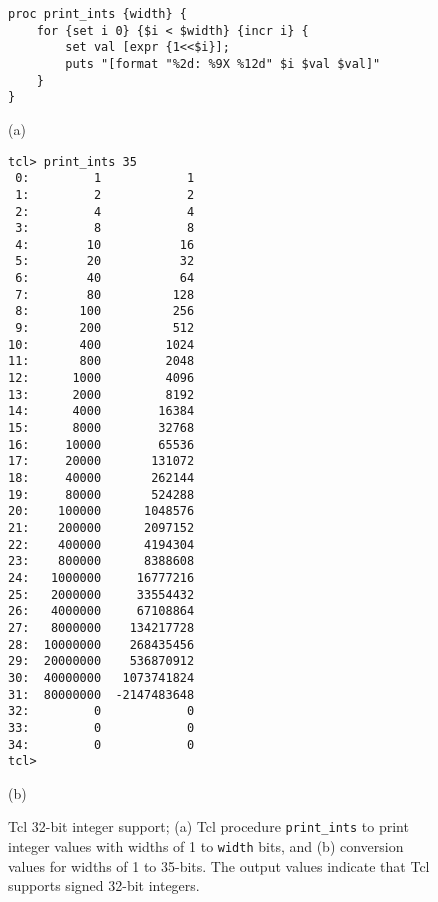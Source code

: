\documentclass[10pt,twoside]{article}
\begin{document}
\begin{figure}[t]
\begin{center}
\begin{minipage}{100mm}
\begin{verbatim}
proc print_ints {width} {
    for {set i 0} {$i < $width} {incr i} {
        set val [expr {1<<$i}];
        puts "[format "%2d: %9X %12d" $i $val $val]"
    }
}
\end{verbatim}
\end{minipage}

(a)

\vskip5mm
\begin{minipage}{60mm}
\begin{verbatim}
tcl> print_ints 35
 0:         1            1
 1:         2            2
 2:         4            4
 3:         8            8
 4:        10           16
 5:        20           32
 6:        40           64
 7:        80          128
 8:       100          256
 9:       200          512
10:       400         1024
11:       800         2048
12:      1000         4096
13:      2000         8192
14:      4000        16384
15:      8000        32768
16:     10000        65536
17:     20000       131072
18:     40000       262144
19:     80000       524288
20:    100000      1048576
21:    200000      2097152
22:    400000      4194304
23:    800000      8388608
24:   1000000     16777216
25:   2000000     33554432
26:   4000000     67108864
27:   8000000    134217728
28:  10000000    268435456
29:  20000000    536870912
30:  40000000   1073741824
31:  80000000  -2147483648
32:         0            0
33:         0            0
34:         0            0
tcl>
\end{verbatim}
\end{minipage}

(b)
\end{center}
\caption{Tcl 32-bit integer support; (a) Tcl procedure
{\tt print\_ints} to print integer values with widths
of 1 to {\tt width} bits, and (b) conversion values for 
widths of 1 to 35-bits. The output values indicate
that Tcl supports signed 32-bit integers.}
\label{fig:tcl_integer_support}
\end{figure}
\end{document}
